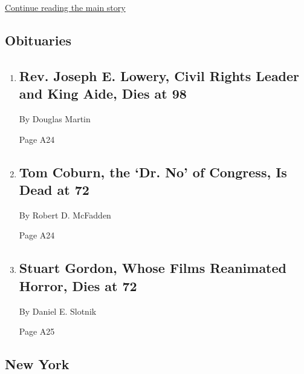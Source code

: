 \protect\hyperlink{after-mid2}{Continue reading the main story}

\hypertarget{obituaries}{%
\subsection{Obituaries}\label{obituaries}}

\begin{enumerate}
\def\labelenumi{\arabic{enumi}.}
\item
  \href{/2020/03/28/us/joseph-lowery-dead.html}{}

  \hypertarget{rev-joseph-e-lowery-civil-rights-leader-and-king-aide-dies-at-98-1}{%
  \subsection{Rev. Joseph E. Lowery, Civil Rights Leader and King Aide,
  Dies at
  98}\label{rev-joseph-e-lowery-civil-rights-leader-and-king-aide-dies-at-98-1}}

  By Douglas Martin

  Page A24
\item
  \href{/2020/03/28/us/tom-coburn-dead.html}{}

  \hypertarget{tom-coburn-the-dr-no-of-congress-is-dead-at-72}{%
  \subsection{Tom Coburn, the `Dr. No' of Congress, Is Dead at
  72}\label{tom-coburn-the-dr-no-of-congress-is-dead-at-72}}

  By Robert D. McFadden

  Page A24
\item
  \href{/2020/03/27/movies/stuart-gordon-dies.html}{}

  \hypertarget{stuart-gordon-whose-films-reanimated-horror-dies-at-72}{%
  \subsection{Stuart Gordon, Whose Films Reanimated Horror, Dies at
  72}\label{stuart-gordon-whose-films-reanimated-horror-dies-at-72}}

  By Daniel E. Slotnik

  Page A25
\end{enumerate}

\hypertarget{new-york}{%
\subsection{New York}\label{new-york}}

